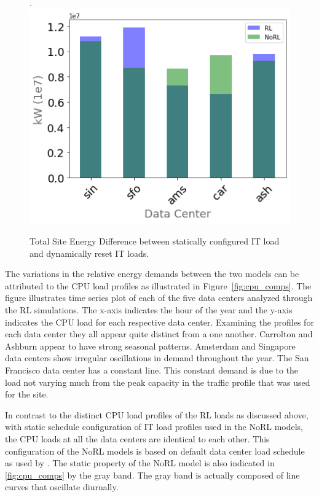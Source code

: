 \begin{figure}.
  \centering
  \includegraphics[scale=0.45]{img/total_energy_comp.png}
  \caption{Total Site Energy Difference between statically configured IT load and dynamically reset IT loads.}
  \label{fig:total_energy_comp}
  \end{figure}

The variations in the relative energy demands between the two models can be attributed to the CPU load profiles as illustrated in Figure~\ref{fig:cpu_comps}. The figure illustrates time series plot of each of the five data centers analyzed through the RL simulations. The x-axis indicates the hour of the year and the y-axis indicates the CPU load for each respective data center. Examining the profiles for each data center they all appear quite distinct from a one another. Carrolton and Ashburn appear to have strong seasonal patterns. Amsterdam and Singapore data centers show irregular oscillations in demand throughout the year. The San Francisco data center has a constant line. This constant demand is due to the load not varying much from the peak capacity in the traffic profile that was used for the site. 

In contrast to the distinct CPU load profiles of the RL loads as discussed above, with static schedule configuration of IT load profiles used in the NoRL models, the CPU loads at all the data centers are identical to each other. This configuration of the NoRL models is based on default data center load schedule as used by \citep{moriyama18}. The static property of the NoRL model is also indicated in \ref{fig:cpu_comps} by the gray band. The gray band is actually composed of line curves that oscillate diurnally.


